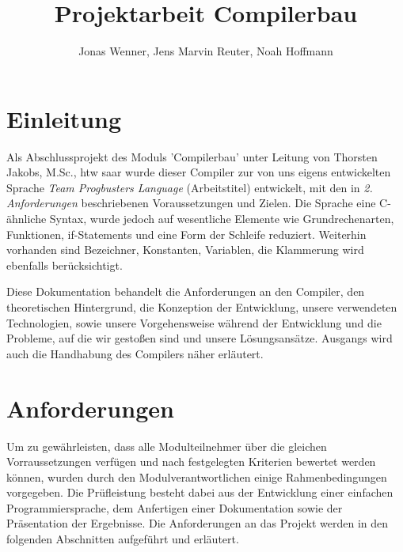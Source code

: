\documentclass[12pt, a4paper, oneside, ngerman]{article}
\title{Projektarbeit Compilerbau}
\begin{document}
\author{Jonas Wenner, Jens Marvin Reuter, Noah Hoffmann}



\maketitle
%
%
\thispagestyle{empty}
\pagebreak

\tableofcontents
\newpage


\section{Einleitung}

Als Abschlussprojekt des Moduls 'Compilerbau' unter Leitung von Thorsten Jakobs, M.Sc., htw saar wurde dieser Compiler zur von uns eigens entwickelten Sprache \textit{Team Progbusters Language} (Arbeitstitel) entwickelt, mit den in \textit{2. Anforderungen} beschriebenen Voraussetzungen und Zielen. Die Sprache eine C-ähnliche Syntax, wurde jedoch auf wesentliche Elemente wie Grundrechenarten, Funktionen, if-Statements und eine Form der Schleife reduziert. Weiterhin vorhanden sind Bezeichner, Konstanten, Variablen, die Klammerung wird ebenfalls ber\"ucksichtigt.


Diese Dokumentation behandelt die Anforderungen an den Compiler, den theoretischen Hintergrund, die Konzeption der Entwicklung, unsere verwendeten Technologien, sowie unsere Vorgehensweise während der Entwicklung und die Probleme, auf die wir gestoßen sind und unsere Lösungsansätze. Ausgangs wird auch die Handhabung des Compilers näher erläutert.

\newpage

\section{Anforderungen}

Um zu gewährleisten, dass alle Modulteilnehmer über die gleichen Vorraussetzungen verfügen und nach festgelegten Kriterien bewertet werden können, wurden durch den Modulverantwortlichen einige Rahmenbedingungen vorgegeben. Die Prüfleistung besteht dabei aus der Entwicklung einer einfachen Programmiersprache, dem Anfertigen einer Dokumentation sowie der Präsentation der Ergebnisse. Die Anforderungen an das Projekt werden in den folgenden Abschnitten aufgeführt und erläutert.
\end{document}

